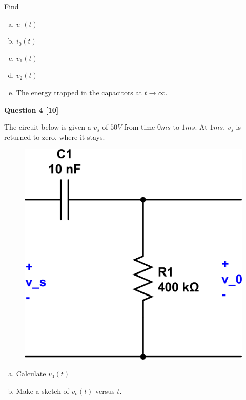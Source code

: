 \documentclass[12pt]{article}
\begin{document}
Find
\begin{enumerate}[(a)]
\item $v_0(t)$
\item $i_0(t)$
\item $v_1(t)$
\item $v_2(t)$
\item The energy trapped in the capacitors at $t \rightarrow \infty$.
\end{enumerate}



{\bf Question 4 [10]} %

The circuit below is given a $v_s$ of $50V$ from time $0ms$ to $1ms$. At $1ms$, $v_s$ is returned to zero, where it stays.

\begin{figure}[h!]
\begin{center}
 \includegraphics[scale=0.3]{p7_84.png}
\end{center}
\end{figure}

\begin{enumerate}[(a)]
\item Calculate $v_0(t)$
\item Make a sketch of $v_o(t)$ versus $t$.
\end{enumerate} 

\newpage
\end{document}
